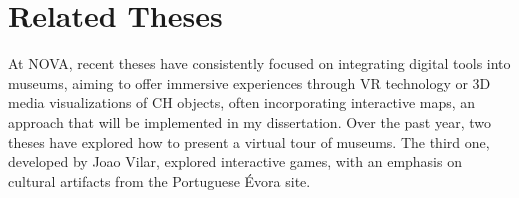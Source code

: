 





\section{Related Theses}
\label{sec:thesis_nova}


At NOVA, recent theses have consistently focused on integrating digital tools into museums, aiming to offer immersive experiences through \gls{VR} technology or \gls{3D} media visualizations 
of \gls{CH} objects, often incorporating interactive maps, an approach that will be implemented in my dissertation. Over the past year, two theses have explored how to 
present a virtual tour of museums. The third one, developed by Joao Vilar, explored interactive games, with an emphasis on cultural artifacts from the Portuguese Évora site.


